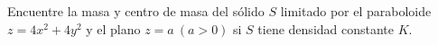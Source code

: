 \item Encuentre la masa y centro de masa del sólido $S$ limitado por el paraboloide $z = 4x^2 + 4y^2$ y el plano $z = a \ (a > 0)$ si $S$ tiene densidad constante $K$.

